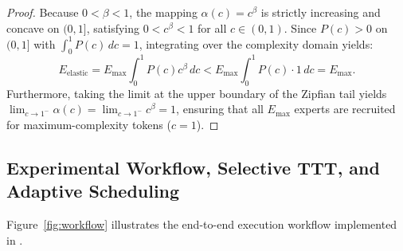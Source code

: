\documentclass{interact}
\begin{document}
\begin{proof}
    Because $0 < \beta < 1$, the mapping $\alpha(c) = c^{\beta}$ is strictly increasing and concave on $(0, 1]$, satisfying $0 < c^{\beta} < 1$ for all $c \in (0, 1)$. Since $P(c) > 0$ on $(0, 1]$ with $\int_0^1 P(c)\,dc = 1$, integrating over the complexity domain yields:
    \begin{equation}
        E_{\text{elastic}} = E_{\max} \int_{0}^{1} P(c) c^{\beta} \, dc < E_{\max} \int_{0}^{1} P(c) \cdot 1 \, dc = E_{\max}.
    \end{equation}
    Furthermore, taking the limit at the upper boundary of the Zipfian tail yields $\lim_{c \to 1^{-}} \alpha(c) = \lim_{c \to 1^{-}} c^{\beta} = 1$, ensuring that all $E_{\max}$ experts are recruited for maximum-complexity tokens ($c = 1$).
\end{proof}

\subsection{Experimental Workflow, Selective TTT, and Adaptive Scheduling}
\label{subsec:workflow}

Figure~\ref{fig:workflow} illustrates the end-to-end execution workflow implemented in .
\end{document}
